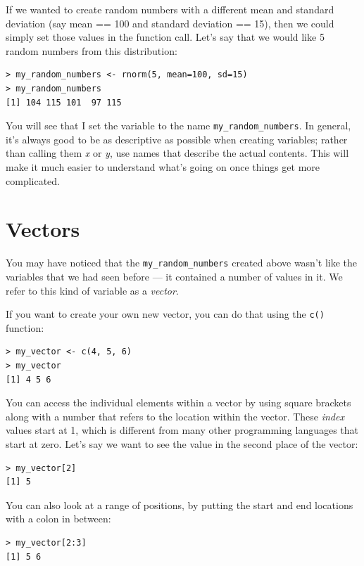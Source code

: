 \documentclass[12pt,]{book}
\begin{document}
If we wanted to create random numbers with a different mean and standard deviation (say mean == 100 and standard deviation == 15), then we could simply set those values in the function call. Let's say that we would like 5 random numbers from this distribution:

\begin{verbatim}
> my_random_numbers <- rnorm(5, mean=100, sd=15)
> my_random_numbers
[1] 104 115 101  97 115
\end{verbatim}

You will see that I set the variable to the name \texttt{my\_random\_numbers}. In general, it's always good to be as descriptive as possible when creating variables; rather than calling them \emph{x} or \emph{y}, use names that describe the actual contents. This will make it much easier to understand what's going on once things get more complicated.

\hypertarget{vectors}{%
\section{Vectors}\label{vectors}}

You may have noticed that the \texttt{my\_random\_numbers} created above wasn't like the variables that we had seen before --- it contained a number of values in it. We refer to this kind of variable as a \emph{vector}.

If you want to create your own new vector, you can do that using the \texttt{c()} function:

\begin{verbatim}
> my_vector <- c(4, 5, 6)
> my_vector
[1] 4 5 6
\end{verbatim}

You can access the individual elements within a vector by using square brackets along with a number that refers to the location within the vector. These \emph{index} values start at 1, which is different from many other programming languages that start at zero.
Let's say we want to see the value in the second place of the vector:

\begin{verbatim}
> my_vector[2]
[1] 5
\end{verbatim}

You can also look at a range of positions, by putting the start and end locations with a colon in between:

\begin{verbatim}
> my_vector[2:3]
[1] 5 6
\end{verbatim}
\end{document}
